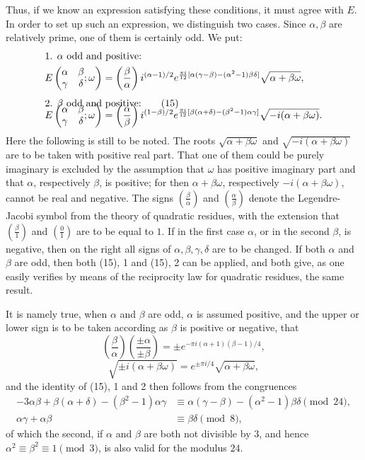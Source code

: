 \documentclass[11pt]{article}
\providecommand{\Jac}[2]{\left(\frac{#1}{#2}\right)}
\begin{document}
Thus, if we know an expression satisfying these conditions, it must agree with $E$. In order to set up such an expression, we distinguish two cases. Since $\alpha,\beta$ are relatively prime, one of them is certainly odd. We put:
\begin{align}
&\text{1. }\alpha\text{ odd and positive:}
\notag\\
&E\left(\begin{matrix}\alpha&\beta\\\gamma&\delta\end{matrix};\omega\right)
=\Jac{\beta}{\alpha} i^{(\alpha-1)/2}
 e^{{\pi i\over12}[\alpha(\gamma-\beta)-(\alpha^2-1)\beta\delta]}
 \sqrt{\alpha+\beta\omega},
\notag\\[0.4em]
&\text{2. }\beta\text{ odd and positive:}
\tag{15}\\[-1.0em]
&E\left(\begin{matrix}\alpha&\beta\\\gamma&\delta\end{matrix};\omega\right)
=\Jac{\alpha}{\beta} i^{(1-\beta)/2}
 e^{{\pi i\over12}[\beta(\alpha+\delta)-(\beta^2-1)\alpha\gamma]}
 \sqrt{-i(\alpha+\beta\omega)}.
\notag
\end{align}
Here the following is still to be noted. The roots $\sqrt{\alpha+\beta\omega}$ and $\sqrt{-i(\alpha+\beta\omega)}$ are to be taken with positive real part. That one of them could be purely imaginary is excluded by the assumption that $\omega$ has positive imaginary part and that $\alpha$, respectively $\beta$, is positive; for then $\alpha+\beta\omega$, respectively $-i(\alpha+\beta\omega)$, cannot be real and negative. The signs $\Jac{\beta}{\alpha}$ and $\Jac{\alpha}{\beta}$ denote the Legendre-Jacobi symbol from the theory of quadratic residues, with the extension that $\Jac{\beta}{1}$ and $\Jac{0}{1}$ are to be equal to $1$. If in the first case $\alpha$, or in the second $\beta$, is negative, then on the right all signs of $\alpha,\beta,\gamma,\delta$ are to be changed. If both $\alpha$ and $\beta$ are odd, then both (15), 1 and (15), 2 can be applied, and both give, as one easily verifies by means of the reciprocity law for quadratic residues, the same result.

It is namely true, when $\alpha$ and $\beta$ are odd, $\alpha$ is assumed positive, and the upper or lower sign is to be taken according as $\beta$ is positive or negative, that
\[
\Jac{\beta}{\alpha}\Jac{\pm\alpha}{\pm\beta}
=\pm e^{-\pi i(\alpha+1)(\beta-1)/4},
\]
\[
\sqrt{\pm i(\alpha+\beta\omega)}=e^{\pm\pi i/4}\sqrt{\alpha+\beta\omega},
\]
and the identity of (15), 1 and 2 then follows from the congruences
\begin{align*}
-3\alpha\beta+\beta(\alpha+\delta)-(\beta^2-1)\alpha\gamma
&\equiv \alpha(\gamma-\beta)-(\alpha^2-1)\beta\delta \pmod{24},\\
\alpha\gamma+\alpha\beta&\equiv \beta\delta \pmod8,
\end{align*}
of which the second, if $\alpha$ and $\beta$ are both not divisible by $3$, and hence $\alpha^2\equiv\beta^2\equiv1\pmod3$, is also valid for the modulus $24$.
\end{document}
